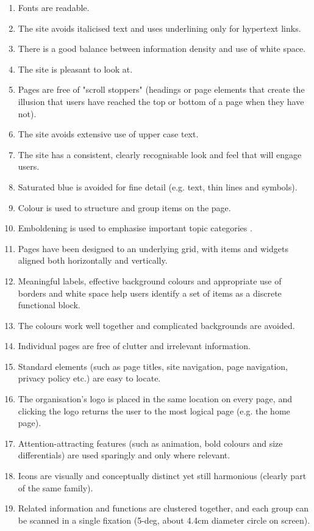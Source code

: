 \begin{itemize}
\begin{enumerate}
        \item Fonts are readable.
        \item The site avoids italicised text and uses underlining only for hypertext links.
        \item There is a good balance between information density and use of white space.
        \item The site is pleasant to look at.
        \item Pages are free of "scroll stoppers" (headings or page elements that create the illusion that users have reached the top or bottom of a page when they have not).
        \item The site avoids extensive use of upper case text.
        \item The site has a consistent, clearly recognisable look and feel that will engage users.
        \item Saturated blue is avoided for fine detail (e.g. text, thin lines and symbols).
        \item Colour is used to structure and group items on the page.
        \item Emboldening is used to emphasise important topic categories .
        \item Pages have been designed to an underlying grid, with items and widgets aligned both horizontally and vertically.
        \item Meaningful labels, effective background colours and appropriate use of borders and white space help users identify a set of items as a discrete functional block.
        \item The colours work well together and complicated backgrounds are avoided.
        \item Individual pages are free of clutter and irrelevant information.
        \item Standard elements (such as page titles, site navigation, page navigation, privacy policy etc.) are easy to locate.
        \item The organisation's logo is placed in the same location on every page, and clicking the logo returns the user to the most logical page (e.g. the home page).
        \item Attention-attracting features (such as animation, bold colours and size differentials) are used sparingly and only where relevant.
        \item Icons are visually and conceptually distinct yet still harmonious (clearly part of the same family).
        \item Related information and functions are clustered together, and each group can be scanned in a single fixation (5-deg, about 4.4cm diameter circle on screen).

\end{enumerate}
\end{itemize}
